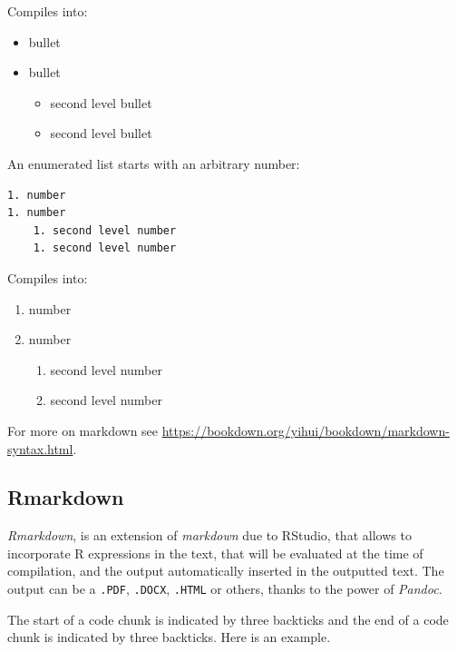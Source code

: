 \documentclass[]{book}
\providecommand{\tightlist}{%
  \setlength{\itemsep}{0pt}\setlength{\parskip}{0pt}}
\theoremstyle{definition}
\theoremstyle{definition}
\theoremstyle{definition}
\theoremstyle{remark}
\begin{document}
Compiles into:

\begin{itemize}
\tightlist
\item
  bullet
\item
  bullet

  \begin{itemize}
  \tightlist
  \item
    second level bullet
  \item
    second level bullet
  \end{itemize}
\end{itemize}

An enumerated list starts with an arbitrary number:

\begin{verbatim}
1. number
1. number
    1. second level number
    1. second level number
\end{verbatim}

Compiles into:

\begin{enumerate}
\def\labelenumi{\arabic{enumi}.}
\tightlist
\item
  number
\item
  number

  \begin{enumerate}
  \def\labelenumii{\arabic{enumii}.}
  \tightlist
  \item
    second level number
  \item
    second level number
  \end{enumerate}
\end{enumerate}

For more on markdown see
\url{https://bookdown.org/yihui/bookdown/markdown-syntax.html}.

\subsection{Rmarkdown}\label{rmarkdown}

\emph{Rmarkdown}, is an extension of \emph{markdown} due to RStudio,
that allows to incorporate R expressions in the text, that will be
evaluated at the time of compilation, and the output automatically
inserted in the outputted text. The output can be a \texttt{.PDF},
\texttt{.DOCX}, \texttt{.HTML} or others, thanks to the power of
\emph{Pandoc}.

The start of a code chunk is indicated by three backticks and the end of
a code chunk is indicated by three backticks. Here is an example.
\end{document}
